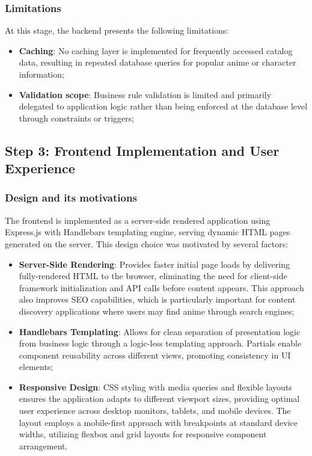 \documentclass[11pt,a4paper]{article}
\begin{document}
\subsubsection{Limitations}
At this stage, the backend presents the following limitations:
\begin{itemize}
    \item \textbf{Caching}: No caching layer is implemented for frequently accessed catalog data, resulting in repeated database queries for popular anime or character information;
    \item \textbf{Validation scope}: Business rule validation is limited and primarily delegated to application logic rather than being enforced at the database level through constraints or triggers;
\end{itemize}





\newpage
\subsection{Step 3: Frontend Implementation and User Experience}

\subsubsection{Design and its motivations}
The frontend is implemented as a server-side rendered application using Express.js with Handlebars templating engine, serving dynamic HTML pages generated on the server. This design choice was motivated by several factors:
\begin{itemize}
    \item \textbf{Server-Side Rendering}: Provides faster initial page loads by delivering fully-rendered HTML to the browser, eliminating the need for client-side framework initialization and API calls before content appears. This approach also improves SEO capabilities, which is particularly important for content discovery applications where users may find anime through search engines;
    \item \textbf{Handlebars Templating}: Allows for clean separation of presentation logic from business logic through a logic-less templating approach. Partials enable component reusability across different views, promoting consistency in UI elements;
    \item \textbf{Responsive Design}: CSS styling with media queries and flexible layouts ensures the application adapts to different viewport sizes, providing optimal user experience across desktop monitors, tablets, and mobile devices. The layout employs a mobile-first approach with breakpoints at standard device widths, utilizing flexbox and grid layouts for responsive component arrangement.
\end{itemize}
\end{document}
